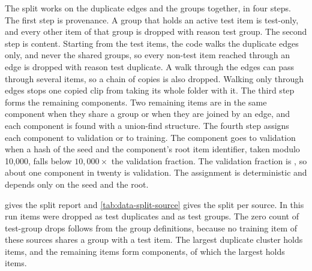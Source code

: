 The split works on the duplicate edges and the groups together, in four steps. The first step is provenance. A group that holds an active test item is test-only, and every other item of that group is dropped with reason test group. The second step is content. Starting from the test items, the code walks the duplicate edges only, and never the shared groups, so every non-test item reached through an edge is dropped with reason test duplicate. A walk through the edges can pass through several items, so a chain of copies is also dropped. Walking only through edges stops one copied clip from taking its whole folder with it. The third step forms the remaining components. Two remaining items are in the same component when they share a group or when they are joined by an edge, and each component is found with a union-find structure. The fourth step assigns each component to validation or to training. The component goes to validation when a hash of the seed and the component's root item identifier, taken modulo 10,000, falls below $10{,}000\times$ the validation fraction. The validation fraction is , so about one component in twenty is validation. The assignment is deterministic and depends only on the seed and the root.

 gives the split report and \cref{tab:data-split-source} gives the split per source. In this run  items were dropped as test duplicates and  as test groups. The zero count of test-group drops follows from the group definitions, because no training item of these sources shares a group with a test item. The largest duplicate cluster holds  items, and the remaining items form  components, of which the largest holds  items. \Preliminary

